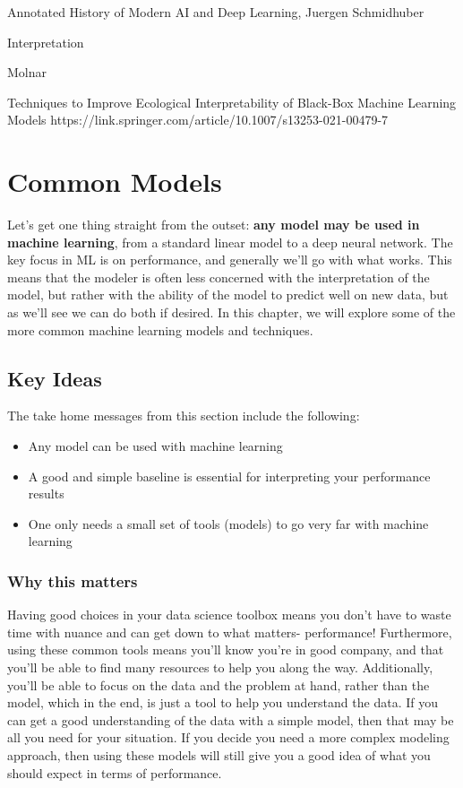 \documentclass[
  letterpaper,
]{krantz}
\providecommand{\tightlist}{%
  \setlength{\itemsep}{0pt}\setlength{\parskip}{0pt}}\usepackage{longtable,booktabs,array}
\begin{document}
Annotated History of Modern AI and Deep Learning, Juergen Schmidhuber

Interpretation

Molnar

Techniques to Improve Ecological Interpretability of Black-Box Machine
Learning Models
https://link.springer.com/article/10.1007/s13253-021-00479-7

\chapter{Common Models}\label{common-models}

Let's get one thing straight from the outset: \textbf{any model may be
used in machine learning}, from a standard linear model to a deep neural
network. The key focus in ML is on performance, and generally we'll go
with what works. This means that the modeler is often less concerned
with the interpretation of the model, but rather with the ability of the
model to predict well on new data, but as we'll see we can do both if
desired. In this chapter, we will explore some of the more common
machine learning models and techniques.

\section{Key Ideas}\label{key-ideas-4}

The take home messages from this section include the following:

\begin{itemize}
\tightlist
\item
  Any model can be used with machine learning
\item
  A good and simple baseline is essential for interpreting your
  performance results
\item
  One only needs a small set of tools (models) to go very far with
  machine learning
\end{itemize}

\subsection{Why this matters}\label{why-this-matters-1}

Having good choices in your data science toolbox means you don't have to
waste time with nuance and can get down to what matters- performance!
Furthermore, using these common tools means you'll know you're in good
company, and that you'll be able to find many resources to help you
along the way. Additionally, you'll be able to focus on the data and the
problem at hand, rather than the model, which in the end, is just a tool
to help you understand the data. If you can get a good understanding of
the data with a simple model, then that may be all you need for your
situation. If you decide you need a more complex modeling approach, then
using these models will still give you a good idea of what you should
expect in terms of performance.
\end{document}
